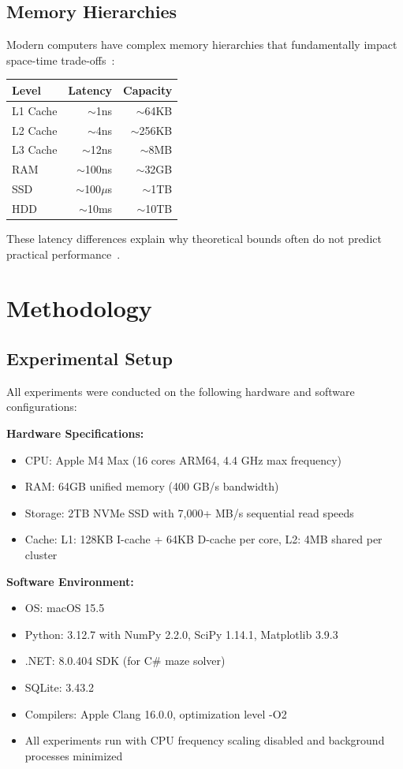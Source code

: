 \documentclass[11pt]{article}
\theoremstyle{definition}
\begin{document}
\subsection{Memory Hierarchies}

Modern computers have complex memory hierarchies that fundamentally impact space-time trade-offs~\cite{vitter2008}:

\begin{center}
\begin{tabular}{lrr}
\toprule
Level & Latency & Capacity \\
\midrule
L1 Cache & $\sim$1ns & $\sim$64KB \\
L2 Cache & $\sim$4ns & $\sim$256KB \\
L3 Cache & $\sim$12ns & $\sim$8MB \\
RAM & $\sim$100ns & $\sim$32GB \\
SSD & $\sim$100$\mu$s & $\sim$1TB \\
HDD & $\sim$10ms & $\sim$10TB \\
\bottomrule
\end{tabular}
\end{center}

These latency differences explain why theoretical bounds often do not predict practical performance~\cite{patrascu2006}.

\section{Methodology}
\label{sec:methodology}

\subsection{Experimental Setup}

All experiments were conducted on the following hardware and software configurations:

\textbf{Hardware Specifications:}
\begin{itemize}
\item CPU: Apple M4 Max (16 cores ARM64, 4.4 GHz max frequency)
\item RAM: 64GB unified memory (400 GB/s bandwidth)
\item Storage: 2TB NVMe SSD with 7,000+ MB/s sequential read speeds
\item Cache: L1: 128KB I-cache + 64KB D-cache per core, L2: 4MB shared per cluster
\end{itemize}

\textbf{Software Environment:}
\begin{itemize}
\item OS: macOS 15.5
\item Python: 3.12.7 with NumPy 2.2.0, SciPy 1.14.1, Matplotlib 3.9.3
\item .NET: 8.0.404 SDK (for C\# maze solver)
\item SQLite: 3.43.2
\item Compilers: Apple Clang 16.0.0, optimization level -O2
\item All experiments run with CPU frequency scaling disabled and background processes minimized
\end{itemize}
\end{document}
